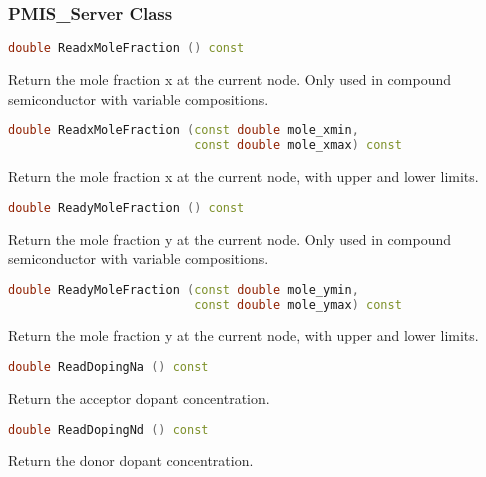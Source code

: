 \documentclass[oneside,12pt]{cgd_book}
\begin{document}
\subsubsection{PMIS\_Server Class}
\label{sec:Extend:PMI:Ref:PMIS}
\par
\begin{lstlisting}[language={C++}]
double ReadxMoleFraction () const
\end{lstlisting}
Return the mole fraction x at the current node. Only used in compound
            semiconductor with variable compositions.
\par
\begin{lstlisting}[language={C++}]
double ReadxMoleFraction (const double mole_xmin,
                          const double mole_xmax) const
\end{lstlisting}
Return the mole fraction x at the current node, with upper and lower
            limits.
\par
\begin{lstlisting}[language={C++}]
double ReadyMoleFraction () const
\end{lstlisting}
Return the mole fraction y at the current node. Only used in compound
            semiconductor with variable compositions.
\par
\begin{lstlisting}[language={C++}]
double ReadyMoleFraction (const double mole_ymin,
                          const double mole_ymax) const
\end{lstlisting}
Return the mole fraction y at the current node, with upper and lower
            limits.
\par
\begin{lstlisting}[language={C++}]
double ReadDopingNa () const
\end{lstlisting}
Return the acceptor dopant concentration.
\par
\begin{lstlisting}[language={C++}]
double ReadDopingNd () const
\end{lstlisting}
Return the donor dopant concentration.
\par
\end{document}

